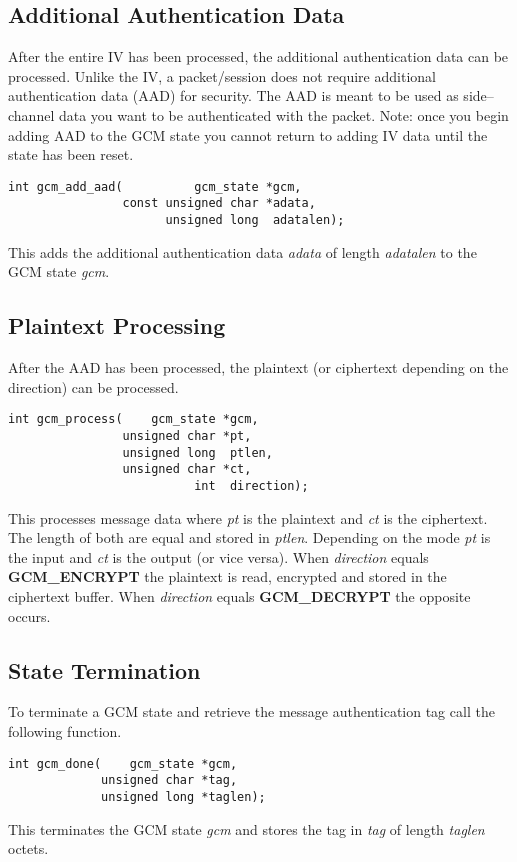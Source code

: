 \documentclass[synpaper]{book}
\begin{document}
\subsection{Additional Authentication Data}
After the entire IV has been processed, the additional authentication data can be processed.  Unlike the IV, a packet/session does not require additional
authentication data (AAD) for security.  The AAD is meant to be used as side--channel data you want to be authenticated with the packet.  Note:  once
you begin adding AAD to the GCM state you cannot return to adding IV data until the state has been reset.

\begin{verbatim}
int gcm_add_aad(          gcm_state *gcm,
                const unsigned char *adata,
                      unsigned long  adatalen);
\end{verbatim}
This adds the additional authentication data \textit{adata} of length \textit{adatalen} to the GCM state \textit{gcm}.

\subsection{Plaintext Processing}
After the AAD has been processed, the plaintext (or ciphertext depending on the direction) can be processed.

\begin{verbatim}
int gcm_process(    gcm_state *gcm,
                unsigned char *pt,
                unsigned long  ptlen,
                unsigned char *ct,
                          int  direction);
\end{verbatim}
This processes message data where \textit{pt} is the plaintext and \textit{ct} is the ciphertext.  The length of both are equal and stored in \textit{ptlen}.  Depending on
the mode \textit{pt} is the input and \textit{ct} is the output (or vice versa).  When \textit{direction} equals \textbf{GCM\_ENCRYPT} the plaintext is read,
encrypted and stored in the ciphertext buffer.  When \textit{direction} equals \textbf{GCM\_DECRYPT} the opposite occurs.

\subsection{State Termination}
To terminate a GCM state and retrieve the message authentication tag call the following function.

\begin{verbatim}
int gcm_done(    gcm_state *gcm,
             unsigned char *tag,
             unsigned long *taglen);
\end{verbatim}
This terminates the GCM state \textit{gcm} and stores the tag in \textit{tag} of length \textit{taglen} octets.
\end{document}
